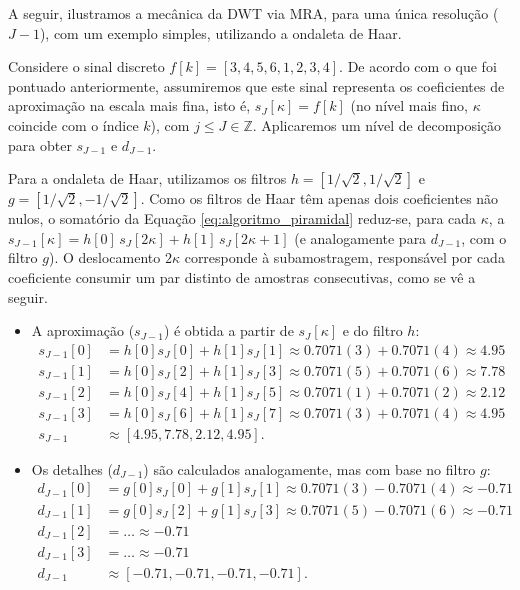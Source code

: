 A seguir, ilustramos a mecânica da DWT via MRA, para uma única resolução (\(J - 1\)), com um exemplo simples, utilizando a ondaleta de Haar. 
\begin{example}
    Considere o sinal discreto \(f[k] = [3, 4, 5, 6, 1, 2, 3, 4]\). 
    De acordo com o que foi pontuado anteriormente, assumiremos que este sinal representa os coeficientes de aproximação na escala mais fina, isto é, \(s_{J}[\kappa] = f[k]\) (no nível mais fino, \(\kappa\) coincide com o índice \(k\)), com \(j \leq J \in \mathbb{Z}\). 
    Aplicaremos um nível de decomposição para obter \(s_{J-1}\) e \(d_{J-1}\).

    Para a ondaleta de Haar, utilizamos os filtros \(h = [1/\sqrt{2}, 1/\sqrt{2}]\) e \(g = [1/\sqrt{2}, -1/\sqrt{2}]\). 
    Como os filtros de Haar têm apenas dois coeficientes não nulos, o somatório da Equação \ref{eq:algoritmo_piramidal} reduz-se, para cada \(\kappa\), a \(s_{J-1}[\kappa] = h[0]\,s_J[2\kappa] + h[1]\,s_J[2\kappa + 1]\) (e analogamente para \(d_{J-1}\), com o filtro \(g\)). 
    O deslocamento \(2\kappa\) corresponde à subamostragem, responsável por cada coeficiente consumir um par distinto de amostras consecutivas, como se vê a seguir.
    \begin{itemize}
        \item A aproximação (\(s_{J-1}\)) é obtida a partir de \(s_J[\kappa]\) e do filtro \(h\):
        \begin{align*}
            s_{J-1}[0] &= h[0]s_J[0] + h[1]s_J[1] \approx 0.7071(3) + 0.7071(4) \approx 4.95 \\
            s_{J-1}[1] &= h[0]s_J[2] + h[1]s_J[3] \approx 0.7071(5) + 0.7071(6) \approx 7.78 \\
            s_{J-1}[2] &= h[0]s_J[4] + h[1]s_J[5] \approx 0.7071(1) + 0.7071(2) \approx 2.12 \\
            s_{J-1}[3] &= h[0]s_J[6] + h[1]s_J[7] \approx 0.7071(3) + 0.7071(4) \approx 4.95 \\
            s_{J-1} &\approx [4.95, 7.78, 2.12, 4.95].
        \end{align*}

        \item Os detalhes (\(d_{J-1}\)) são calculados analogamente, mas com base no filtro \(g\):
        \begin{align*}
            d_{J-1}[0] &= g[0]s_J[0] + g[1]s_J[1] \approx 0.7071(3) - 0.7071(4) \approx -0.71 \\
            d_{J-1}[1] &= g[0]s_J[2] + g[1]s_J[3] \approx 0.7071(5) - 0.7071(6) \approx -0.71 \\
            d_{J-1}[2] &= \dots \approx -0.71 \\
            d_{J-1}[3] &= \dots \approx -0.71 \\
            d_{J-1} &\approx [-0.71, -0.71, -0.71, -0.71].
        \end{align*}
        
    \end{itemize}
\end{example} 

